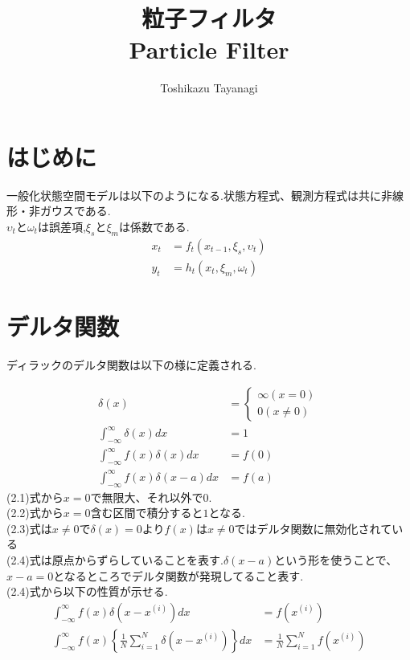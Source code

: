 \documentclass[dvipdfmx,uplatex,10pt]{jsarticle}
\begin{document}
\title{粒子フィルタ\\ {\normalsize Particle Filter}}
\author{Toshikazu Tayanagi}
\maketitle

\section{はじめに}
一般化状態空間モデルは以下のようになる.状態方程式、観測方程式は共に非線形・非ガウスである.\\
$\upsilon_{t}$と$\omega_{t}$は誤差項,$\xi_{s}$と$\xi_{m}$は係数である.
\begin{align}
  x_{t}&=f_{t}(x_{t-1},\xi_{s},\upsilon_{t})\\
  y_{t}&=h_{t}(x_{t},\xi_{m},\omega_{t})
\end{align}
\section{デルタ関数}
ディラックのデルタ関数\footnotemark[1]は以下の様に定義される.

\begin{align}
  \delta(x)&=
  \begin{cases}
	\infty(x=0)\\
	0(x\neq 0)
  \end{cases}\\
  \int_{-\infty}^{\infty}\delta (x) dx&=1\\
  \int_{-\infty}^{\infty}f(x)\delta (x)dx&=f(0)\\
  \int_{-\infty}^{\infty}f(x)\delta(x-a)dx&=f(a)
\end{align}
(2.1)式から$x=0$で無限大、それ以外で$0$.\\
(2.2)式から$x=0$含む区間で積分すると$1$となる.\\
(2.3)式は$x\neq0$で$\delta(x)=0$より$f(x)$は$x\neq0$ではデルタ関数に無効化されている\\
(2.4)式は原点からずらしていることを表す.$\delta(x-a)$という形を使うことで、$x-a=0$となるところでデルタ関数が発現してること表す.\\
(2.4)式から以下の性質が示せる.
\begin{align}
  \int_{-\infty}^{\infty}f(x)\delta(x-x^{(i)})dx&=f(x^{(i)})\\
  \int_{-\infty}^{\infty}f(x)\left\{\frac{1}{N}\sum_{i=1}^{N}\delta(x-x^{(i)})\right\}dx&=\frac{1}{N}\sum_{i=1}^{N}f(x^{(i)})
\end{align}
\end{document}
